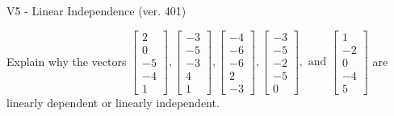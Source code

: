 \begin{exercise}
  \begin{exerciseTitle}V5 - Linear Independence (ver. 401)\end{exerciseTitle}
  \begin{exerciseStatement}
    Explain why the vectors \(\left[\begin{array}{r}
2 \\
0 \\
-5 \\
-4 \\
1
\end{array}\right] , \left[\begin{array}{r}
-3 \\
-5 \\
-3 \\
4 \\
1
\end{array}\right] , \left[\begin{array}{r}
-4 \\
-6 \\
-6 \\
2 \\
-3
\end{array}\right] , \left[\begin{array}{r}
-3 \\
-5 \\
-2 \\
-5 \\
0
\end{array}\right] , \text{ and } \left[\begin{array}{r}
1 \\
-2 \\
0 \\
-4 \\
5
\end{array}\right]\) are linearly dependent or linearly independent.	



\end{exerciseStatement}
\end{exercise}
